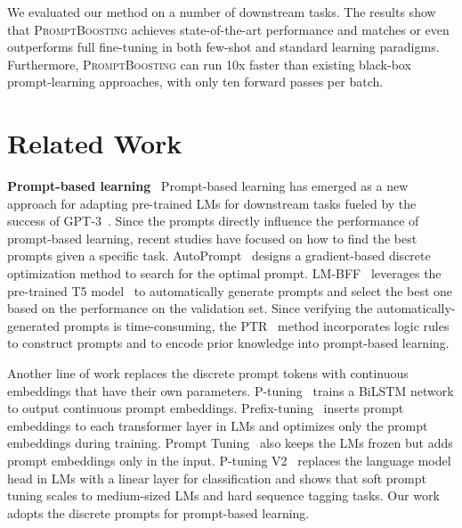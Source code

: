 \documentclass{article}
\theoremstyle{plain}
\theoremstyle{definition}
\theoremstyle{remark}
\newcommand{\alg}{\textsc{PromptBoosting}}
\begin{document}
We evaluated our method on a number of downstream tasks. The results show that {\alg} achieves state-of-the-art performance and matches or even outperforms full fine-tuning in both few-shot and standard learning paradigms. Furthermore, {\alg} can run 10x faster than existing black-box prompt-learning approaches, with only ten forward passes per batch. 

\section{Related Work}
\textbf{Prompt-based learning} \ 
Prompt-based learning has emerged as a new approach for adapting pre-trained LMs for downstream tasks fueled by the success of GPT-3~\citep{brown2020language}. Since the prompts directly influence the performance of prompt-based learning, recent studies have focused on how to find the best prompts given a specific task. AutoPrompt~\citep{shin2020autoprompt} designs a gradient-based discrete optimization method to search for the optimal prompt. LM-BFF~\citep{gao2021making} leverages the pre-trained T5 model~\citep{raffel2020exploring} to automatically generate prompts and select the best one based on the performance on the validation set. Since verifying the automatically-generated prompts is time-consuming, the PTR~\citep{han2021ptr} method incorporates logic rules to construct prompts and to encode prior knowledge into prompt-based learning. 

Another line of work replaces the discrete prompt tokens with continuous embeddings that have their own parameters. P-tuning~\citep{liu2021gpt} trains a BiLSTM network to output continuous prompt embeddings. Prefix-tuning~\citep{li2021prefix} inserts prompt embeddings to each transformer layer in LMs and optimizes only the prompt embeddings during training. Prompt Tuning~\citep{lester2021power} also keeps the LMs frozen but adds prompt embeddings only in the input. P-tuning V2~\citep{liu2022ptuningv2} replaces the language model head in LMs with a linear layer for classification and shows that soft prompt tuning scales to medium-sized LMs and hard sequence tagging tasks. Our work adopts the discrete prompts for prompt-based learning.
\end{document}
